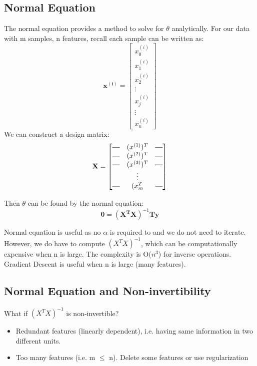     \subsection{Normal Equation}

        The normal equation provides a method to solve for $\theta$ analytically. For our data with m samples, n features, recall each sample can be written as: 
       \[ 
        \mathbf{x^{(i)}} =  \begin{bmatrix}
            x_0^{(i)}\\
            x_1^{(i)} \\
            x_2^{(i)} \\
            \vdots \\
            x_j^{(i)}\\
           \vdots \\
           x_n^{(i)}
            \end{bmatrix}
        \]
        We can construct a design matrix:
        \[ \mathbf{X} = \begin{bmatrix}
            \horzbar & (x^{(1)})^T & \horzbar \\
            \horzbar & (x^{(2)})^T & \horzbar \\
            \horzbar & (x^{(3)})^T & \horzbar \\
                     & \vdots      &          \\
            \horzbar & (x_{m}^{T}  & \horzbar \\
         \end{bmatrix}
        \]

         Then $\theta$ can be found by the normal equation: 
                 \begin{equation}
                 \mathbf{\theta} = \mathbf{(X^TX)}^{-1}\mathbf{Ty}
                     \label{eq:normal}
                 \end{equation}

        
        Normal equation is useful as no $\alpha$ is required to and we do not need to iterate. However, we do have to compute $(X^TX)^{-1}$, which can be computationally expensive when n is large. The complexity is O($n^3$) for inverse operations. Gradient Descent is useful when n is large (many features). 

     \subsection{Normal Equation and Non-invertibility}

     What if $(X^TX)^{-1}$ is non-invertible? 

     \begin{itemize}
         \item Redundant features (linearly dependent), i.e. having same information in two different units.
         \item Too many features (i.e. m $\leq$ n). Delete some features or use regularization
     \end{itemize}



